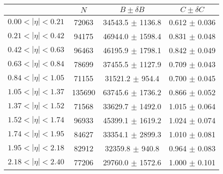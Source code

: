 \begin{tabular}{lccc}
\hline
    &   $N$   & $B \pm \delta B$  &  $C \pm \delta C$ \\
\hline
$0.00 < |\eta| <0.21$          & 72063      & 34543.5    $\pm$ 1136.8 & 0.612      $\pm$ 0.036 \\
$0.21 < |\eta| <0.42$          & 94175      & 46944.0    $\pm$ 1598.4 & 0.831      $\pm$ 0.048 \\
$0.42 < |\eta| <0.63$          & 96463      & 46195.9    $\pm$ 1798.1 & 0.842      $\pm$ 0.049 \\
$0.63 < |\eta| <0.84$          & 78699      & 37455.5    $\pm$ 1127.9 & 0.709      $\pm$ 0.043 \\
$0.84 < |\eta| <1.05$          & 71155      & 31521.2    $\pm$ 954.4 & 0.700      $\pm$ 0.045 \\
$1.05 < |\eta| <1.37$          & 135690     & 63745.6    $\pm$ 1736.2 & 0.866      $\pm$ 0.052 \\
$1.37 < |\eta| <1.52$          & 71568      & 33629.7    $\pm$ 1492.0 & 1.015      $\pm$ 0.064 \\
$1.52 < |\eta| <1.74$          & 96933      & 45399.1    $\pm$ 1619.2 & 1.024      $\pm$ 0.074 \\
$1.74 < |\eta| <1.95$          & 84627      & 33354.1    $\pm$ 2899.3 & 1.010      $\pm$ 0.081 \\
$1.95 < |\eta| <2.18$          & 82912      & 32359.8    $\pm$ 940.8 & 0.964      $\pm$ 0.083 \\
$2.18 < |\eta| <2.40$          & 77206      & 29760.0    $\pm$ 1572.6 & 1.000      $\pm$ 0.101 \\
\hline
\end{tabular}
